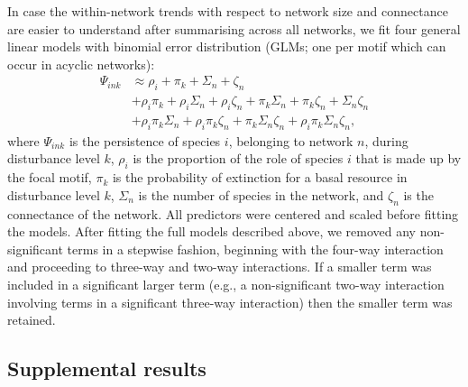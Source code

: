 \documentclass[12pt]{article}
\begin{document}
\begin{spacing}{2.0}
        In case the within-network trends with respect to network size and connectance are easier to understand after summarising across all networks, we fit four general linear models with binomial error distribution (GLMs; one per motif which can occur in acyclic networks): 
             \begin{equation}
             \begin{aligned}
            \Psi_{ink} & \approx \rho_{i} + \pi_{k} + \Sigma_{n} + \zeta_{n} \\
            & + \rho_{i}\pi_{k} + \rho_{i}\Sigma_{n} + \rho_{i}\zeta_{n} + \pi_{k}\Sigma_{n} + \pi_{k}\zeta_{n} + \Sigma_{n}\zeta_{n} \\
            & + \rho_{i}\pi_{k}\Sigma_{n} + \rho_{i}\pi_{k}\zeta_{n} + \pi_{k}\Sigma_{n}\zeta_{n} + \rho_{i}\pi_{k}\Sigma_{n}\zeta_{n} ,
            \label{propreq}
            \end{aligned}
            \end{equation}
            \noindent where $\Psi_{ink}$ is the persistence of species $i$, belonging to network $n$, during disturbance level $k$, $\rho_{i}$ is the proportion of the role of species $i$ that is made up by the focal motif, $\pi_k$ is the probability of extinction for a basal resource in disturbance level $k$, $\Sigma_{n}$ is the number of species in the network, and $\zeta_{n}$ is the connectance of the network.
            All predictors were centered and scaled before fitting the models.    
            After fitting the full models described above, we removed any non-significant terms in a stepwise fashion, beginning with the four-way interaction and proceeding to three-way and two-way interactions.
            If a smaller term was included in a significant larger term (e.g., a non-significant two-way interaction involving terms in a significant three-way interaction) then the smaller term was retained.

    \subsection{Supplemental results}
    

\end{spacing}
\end{document}
